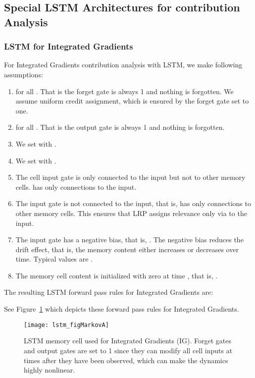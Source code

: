\documentclass{article}
\begin{document}
\begin{appendices}
\subsection{Special LSTM Architectures for contribution Analysis}
\label{sec:ALSTMadjust}


\subsubsection{LSTM for Integrated Gradients}

For Integrated Gradients contribution analysis with LSTM, 
we make following assumptions:
\begin{enumerate}[label=\textbf{(A\arabic*)}]
\item  for all . That is the forget gate is always 1 and
  nothing is forgotten. We assume uniform credit assignment, which
  is ensured by the forget gate set to one.

\item  for all . That is the output gate is always 1 and
  nothing is forgotten. 

\item We set  with .

\item We set  with .

\item The cell input gate  is only connected to the input but not
  to other memory cells.   has only connections to the
  input. 

\item The input gate  is not connected to the input, that is,
   has only connections to other memory cells. This ensures
  that LRP assigns relevance only via  to the input.


\item The input gate  has a negative bias, that is,
  . The negative bias
  reduces the drift effect, that is, the memory 
  content  either increases or decreases over time.
  Typical values are .

\item The memory cell content is initialized with zero at time ,
  that is, .
 
\end{enumerate}

The resulting LSTM forward pass rules for Integrated Gradients are:

See Figure~\ref{fig:cellMarkovA} which depicts these  
forward pass rules for Integrated Gradients. 


\begin{figure}[htb]
\centering
\texttt{[image: lstm\_figMarkovA]}
\caption{LSTM memory cell used for Integrated Gradients (IG). 
  Forget gates and output gates are set to 1 since they
  can modify all cell inputs at times after they have been observed,
  which can make the dynamics highly nonlinear.
\label{fig:cellMarkovA}}
\end{figure}



\end{appendices}
\end{document}
